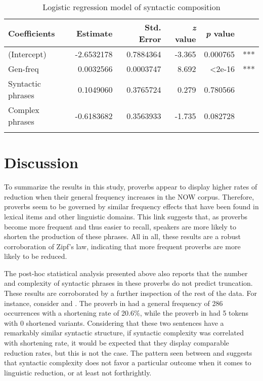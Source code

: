 \documentclass[output=paper,colorlinks,citecolor=brown,draftmode]{langscibook}
\begin{document}
\begin{table}%
\caption{Logistic regression model of syntactic composition}
\label{tab:2:syntactic_regression}
 \begin{tabular}{l @{\hskip 0.25in} r @{\hskip 0.25in} r @{\hskip 0.25in} r @{\hskip 0.25in} r @{\hskip 0.25in} l}
  \lsptoprule
    Coefficients & Estimate & Std. Error & \textit{z} value & \textit{p} value & \\
  \midrule
  (Intercept) & -2.6532178 & 0.7884364 & -3.365 & 0.000765 & *** \\
  Gen-freq & 0.0032566 & 0.0003747 & 8.692 & \textless2e-16 & *** \\
  Syntactic phrases & 0.1049060 & 0.3765724 & 0.279 & 0.780566 & \\
  Complex phrases & -0.6183682 & 0.3563933 & -1.735 & 0.082728 & \\
  \lspbottomrule
 \end{tabular}
\end{table}

\section{Discussion}\label{sec:discussion}

To summarize the results in this study, proverbs appear to display higher rates of reduction when their general frequency increases in the NOW corpus. Therefore, proverbs seem to be governed by similar frequency effects that have been found in lexical items and other linguistic domains. This link suggests that, as proverbs become more frequent and thus easier to recall, speakers are more likely to shorten the production of these phrases. All in all, these results are a robust corroboration of Zipf’s law, indicating that more frequent proverbs are more likely to be reduced.

The post-hoc statistical analysis presented above also reports that the number and complexity of syntactic phrases in these proverbs do not predict truncation. These results are corroborated by a further inspection of the rest of the data. For instance, consider  and . The proverb in  had a general frequency of 286 occurrences with a shortening rate of 20.6\%, while the proverb in  had 5 tokens with 0 shortened variants. Considering that these two sentences have a remarkably similar syntactic structure, if syntactic complexity was correlated with shortening rate, it would be expected that they  display comparable reduction rates, but this is not the case. The pattern seen between  and  suggests that syntactic complexity does not favor a particular outcome when it comes to linguistic reduction, or at least not forthrightly.
\end{document}
